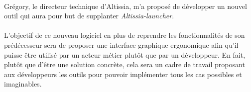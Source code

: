 
\paragraph{}
Grégory, le directeur technique d'Altissia, m'a proposé de développer un nouvel outil qui aura pour but de supplanter \textit{Altissia-launcher}.

\paragraph{}
L'objectif de ce nouveau logiciel en plus de reprendre les fonctionnalités de son prédécesseur sera de proposer une interface graphique ergonomique afin qu'il puisse être utilisé par un acteur métier plutôt que par un développeur.
En fait, plutôt que d'être une solution concrète, cela sera un cadre de travail proposant aux développeurs les outils pour pouvoir implémenter tous les cas possibles et imaginables.
